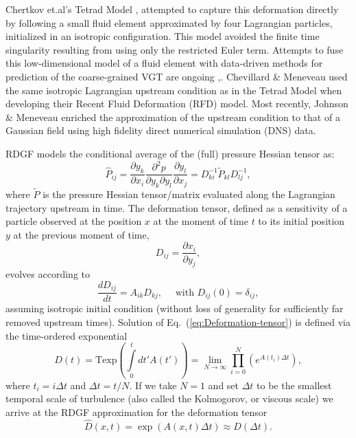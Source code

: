 Chertkov et.al's Tetrad Model \cite{chertkov1999}, attempted to capture this deformation directly by following a small fluid element approximated by four Lagrangian particles, initialized in an isotropic configuration. This model avoided the finite time singularity resulting from using only the restricted Euler term\cite{cantwell1992}. Attempts to fuse this low-dimensional model of a fluid element with data-driven methods for prediction of the coarse-grained VGT are ongoing \cite{hyett2021machine},\cite{hyett2020machine}. Chevillard \& Meneveau used the same isotropic Lagrangian upstream condition as in the Tetrad Model when developing their Recent Fluid Deformation (RFD) model. Most recently, Johnson \& Meneveau enriched the approximation of the upstream condition to that of a Gaussian field using high fidelity direct numerical simulation (DNS) data\cite{wan2016johns}.

RDGF models the conditional average of the (full) pressure Hessian tensor as:
\begin{equation}
    \hat{P}_{ij} = \frac{\partial y_k}{\partial x_i} \frac{\partial^2 p}{\partial y_k\partial y_l} \frac{\partial y_l}{\partial x_j} = D^{-1}_{ki} \tilde{P}_{kl} D^{-1}_{lj},
\end{equation}
where $\tilde{P}$ is the pressure Hessian tensor/matrix evaluated along the Lagrangian trajectory upstream in time. The deformation tensor, defined as a sensitivity  of a particle observed at the position $x$ at the moment of time $t$ to its initial position $y$ at the previous moment of time,
\begin{equation}
    D_{ij} = \frac{\partial x_i}{\partial y_j},
\end{equation}
evolves according to 
\begin{equation}\label{eq:Deformation-tensor}
    \frac{d D_{ij}}{dt} = A_{ik} D_{kj}, \quad \text{ with }  D_{ij}(0) = \delta_{ij},
\end{equation}
assuming isotropic initial condition (without loss of generality for sufficiently far removed upstream times). Solution of Eq.~(\ref{eq:Deformation-tensor}) is defined via the time-ordered exponential
\begin{equation}
    D(t) = \text{Texp}\left(\int\limits_0^t dt' A(t')\right) = \lim_{N\to \infty} \prod_{i = 0}^N \left( e^{A(t_i)\Delta t} \right),
\end{equation}
where %
$t_i=i \Delta t$ and $\Delta t= t/N$. %
If we take $N=1$ and set $\Delta t$ to be the smallest temporal scale of turbulence (also called the Kolmogorov, or viscous scale) we arrive at %
the RDGF approximation for the deformation tensor
\begin{equation}
    \hat{D}(x,t) = \exp\left( A(x,t) \Delta t \right) \approx D(\Delta t).
\end{equation}

